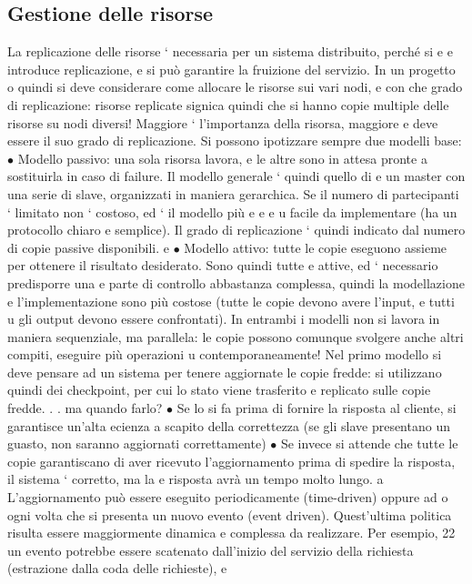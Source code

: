 \documentclass[a4paper,12pt]{article}
\begin{document}
\subsection{Gestione delle risorse}
La replicazione delle risorse ` necessaria per un sistema distribuito, perché si
e
e
introduce replicazione, e si può garantire la fruizione del servizio. In un progetto
o
quindi si deve considerare come allocare le risorse sui vari nodi, e con che grado di replicazione: risorse replicate
signica quindi che si hanno copie multiple
delle risorse su nodi diversi! Maggiore ` l'importanza della risorsa, maggiore
e
deve essere il suo grado di replicazione.
Si possono ipotizzare sempre due modelli base:
$\bullet$ Modello passivo: una sola risorsa lavora, e le altre sono in attesa pronte
a sostituirla in caso di failure. Il modello generale ` quindi quello di
e
un master con una serie di slave, organizzati in maniera gerarchica. Se
il numero di partecipanti ` limitato non ` costoso, ed ` il modello più
e
e
e
u
facile da implementare (ha un protocollo chiaro e semplice). Il grado di
replicazione ` quindi indicato dal numero di copie passive disponibili.
e
$\bullet$ Modello attivo: tutte le copie eseguono assieme per ottenere il risultato
desiderato. Sono quindi tutte e attive, ed ` necessario predisporre una
e
parte di controllo abbastanza complessa, quindi la modellazione e l'implementazione sono più costose (tutte le copie
devono avere l'input, e tutti
u
gli output devono essere confrontati).
In entrambi i modelli non si lavora in maniera sequenziale, ma parallela: le
copie possono comunque svolgere anche altri compiti, eseguire più operazioni
u
contemporaneamente!
Nel primo modello si deve pensare ad un sistema per tenere aggiornate le
copie fredde: si utilizzano quindi dei checkpoint, per cui lo stato viene trasferito
e replicato sulle copie fredde. . . ma quando farlo?
$\bullet$ Se lo si fa prima di fornire la risposta al cliente, si garantisce un'alta
ecienza a scapito della correttezza (se gli slave presentano un guasto,
non saranno aggiornati correttamente)
$\bullet$ Se invece si attende che tutte le copie garantiscano di aver ricevuto l'aggiornamento prima di spedire la
risposta, il sistema ` corretto, ma la
e
risposta avrà un tempo molto lungo.
a
L'aggiornamento può essere eseguito periodicamente (time-driven) oppure ad
o
ogni volta che si presenta un nuovo evento (event driven). Quest'ultima politica
risulta essere maggiormente dinamica e complessa da realizzare. Per esempio,
22
un evento potrebbe essere scatenato dall'inizio del servizio della richiesta (estrazione dalla coda delle richieste), e
\end{document}
